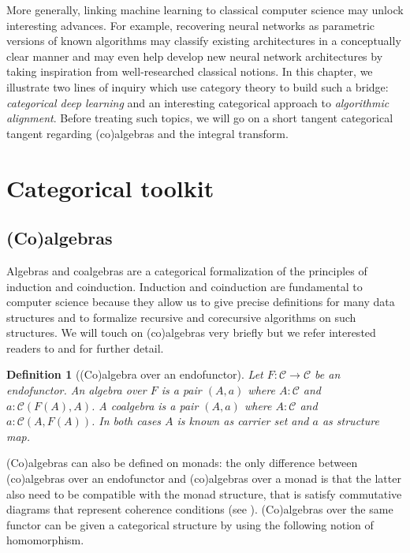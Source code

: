 \documentclass[11pt,a4paper,openright,twoside]{report}
\newcounter{mycounter}
\theoremstyle{plain}
\newtheorem{definition}[mycounter]{Definition}
\theoremstyle{definition}
\begin{document}
More generally, linking machine learning to classical computer science may unlock interesting advances. For example, recovering neural networks as parametric versions of known algorithms may classify existing architectures in a conceptually clear manner and may even help develop new neural network architectures by taking inspiration from well-researched classical notions. In this chapter, we illustrate two lines of inquiry which use category theory to build such a bridge: \textit{categorical deep learning} and an interesting categorical approach to \textit{algorithmic alignment}. Before treating such topics, we will go on a short tangent categorical tangent regarding (co)algebras and the integral transform.




\section{Categorical toolkit}

\subsection{(Co)algebras}
\label{subsec: algebras}

Algebras and coalgebras are a categorical formalization of the principles of induction and coinduction. Induction and coinduction are fundamental to computer science because they allow us to give precise definitions for many data structures and to formalize recursive and corecursive algorithms on such structures. We will touch on (co)algebras very briefly but we refer interested readers to \cite{jacobs1997tutorial} and \cite{wisbauer2008algebras} for further detail.

\begin{definition}[(Co)algebra over an endofunctor]
  \label{def: endalg}
  Let $F: \mathcal{C} \to \mathcal{C}$ be an endofunctor. An algebra over $F$ is a pair $(A,a)$ where $A: \mathcal{C}$ and $a:\mathcal{C}(F(A),A)$. A coalgebra is a pair $(A,a)$ where $A: \mathcal{C}$ and $a:\mathcal{C}(A,F(A))$. In both cases $A$ is known as carrier set and $a$ as structure map.
\end{definition}

(Co)algebras can also be defined on monads: the only difference between (co)algebras over an endofunctor and (co)algebras over a monad is that the latter also need to be compatible with the monad structure, that is satisfy commutative diagrams that represent coherence conditions (see \cite{gavranovicposition}). (Co)algebras over the same functor can be given a categorical structure by using the following notion of homomorphism.
\end{document}

